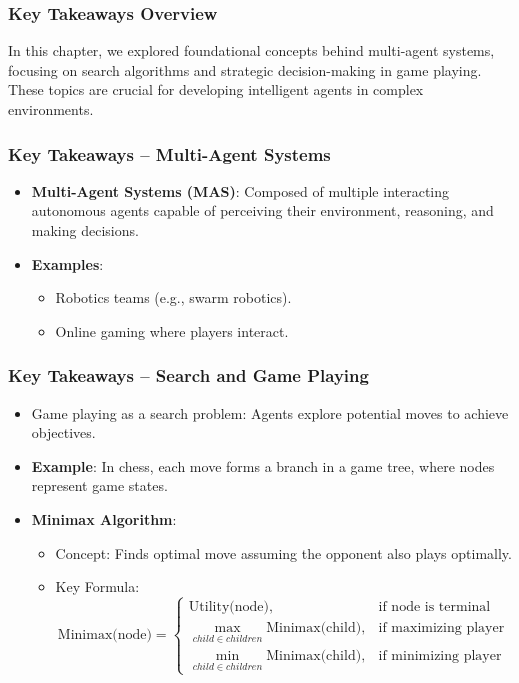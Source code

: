 \documentclass[aspectratio=169]{beamer}
\begin{document}
\begin{frame}[fragile]
    \frametitle{Key Takeaways Overview}
    In this chapter, we explored foundational concepts behind multi-agent systems, focusing on search algorithms and strategic decision-making in game playing. These topics are crucial for developing intelligent agents in complex environments.
\end{frame}

\begin{frame}[fragile]
    \frametitle{Key Takeaways – Multi-Agent Systems}
    \begin{itemize}
        \item \textbf{Multi-Agent Systems (MAS)}: Composed of multiple interacting autonomous agents capable of perceiving their environment, reasoning, and making decisions.
        \item \textbf{Examples}:
        \begin{itemize}
            \item Robotics teams (e.g., swarm robotics).
            \item Online gaming where players interact.
        \end{itemize}
    \end{itemize}
\end{frame}

\begin{frame}[fragile]
    \frametitle{Key Takeaways – Search and Game Playing}
    \begin{itemize}
        \item Game playing as a search problem: Agents explore potential moves to achieve objectives.
        \item \textbf{Example}: In chess, each move forms a branch in a game tree, where nodes represent game states. 

        \item \textbf{Minimax Algorithm}:
        \begin{itemize}
            \item Concept: Finds optimal move assuming the opponent also plays optimally.
            \item Key Formula:
            \begin{equation}
                \text{Minimax(node)} =
                \begin{cases}
                    \text{Utility(node)}, & \text{if node is terminal} \\
                    \max_{child \in children} \text{Minimax(child)}, & \text{if maximizing player} \\
                    \min_{child \in children} \text{Minimax(child)}, & \text{if minimizing player}
                \end{cases}
            \end{equation}
        \end{itemize}
    \end{itemize}
\end{frame}
\end{document}
